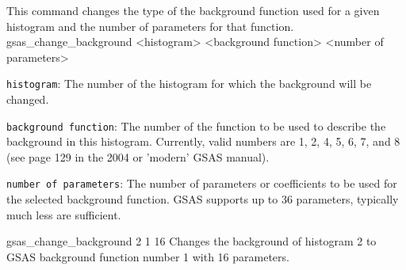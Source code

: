 {
This command changes the type of the background function used for a given histogram and the number of parameters for that function.
}{
gsas\_change\_background <histogram> <background function> <number of parameters>
}{
\item \texttt{histogram}: The number of the histogram for which the background will be changed.
\item \texttt{background function}: The number of the function to be used to describe the background in this histogram. Currently, valid numbers are 1, 2, 4, 5, 6, 7, and 8 (see page 129 in the 2004 or 'modern' GSAS manual).
\item \texttt{number of parameters}: The number of parameters or coefficients to be used for the selected background function. GSAS supports up to 36 parameters, typically much less are sufficient.
}{
gsas\_change\_background 2 1 16
}{
Changes the background of histogram 2 to GSAS background function number 1 with 16 parameters.
}

